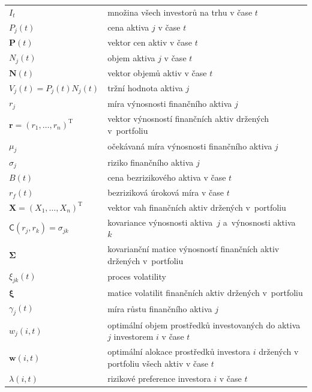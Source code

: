 \documentclass[a4paper,12pt]{report}
\theoremstyle{definition} \newtheorem{definice}[veta]{Definice}
\theoremstyle{remark}
\begin{document}
   \begin{tabular}{p{4cm} p{9.3cm}}
   $I_t$ 								& množina všech investorů na trhu v čase $t$\\
   $P_j(t)$                             &   cena aktiva $j$ v čase $t$ \\
   $\boldsymbol{P}(t)$                             &   vektor cen aktiv v čase $t$\\
   $N_j(t)$                             &   objem aktiva $j$ v čase $t$ \\
   $\boldsymbol{N}(t)$     &   vektor objemů aktiv v čase $t$\\
   $V_j(t)=P_j(t)N_j(t)$       &  tržní hodnota aktiva $j$\\
   $r_j$  								& míra výnosnosti finančního aktiva $j$\\
   $\boldsymbol{r}=(r_1,\dots,r_n)^\mathrm{T}$  		& vektor výnosností finančních aktiv držených v~portfoliu\\
   $\mu_j$ 								& očekávaná míra výnosnosti finančního aktiva $j$\\
   $\sigma_j$								& riziko finančního aktiva $j$\\
   $B(t)$ 								& cena bezrizikového aktiva v čase $t$\\
   $r_f(t)$ 								& bezriziková úroková míra v čase $t$\\
   $\boldsymbol{X}=(X_1,\dots,X_n)^\mathrm{T}$		& vektor vah finančních aktiv držených v~portfoliu\\
   $\mathsf{C}(r_j,r_k)=\sigma_{jk}$				& kovariance výnosnosti aktiva~$j$ a~výnosnosti aktiva~$k$\\
   $\boldsymbol{\Sigma}$						& kovarianční matice výnosností finančních aktiv držených v~portfoliu\\
   $\xi_{jk}(t)$ 							& proces volatility\\
   $\boldsymbol{\xi}$						& matice volatilit finančních aktiv držených v~portfoliu\\
   $\gamma_j(t)$ 							& míra růstu  finančního aktiva $j$\\
   $w_{j}(i,t)$ 							& optimální objem prostředků investovaných do aktiva $j$ investorem $i$ v čase $t$\\
   $\boldsymbol{w}(i,t)$					 	& optimální alokace prostředků investora $i$ držených v portfoliu všech aktiv v čase $t$\\
   $\lambda(i,t)$							& rizikové preference investora $i$ v čase $t$ \\  
\end{tabular}\\\\\\
\end{document}
